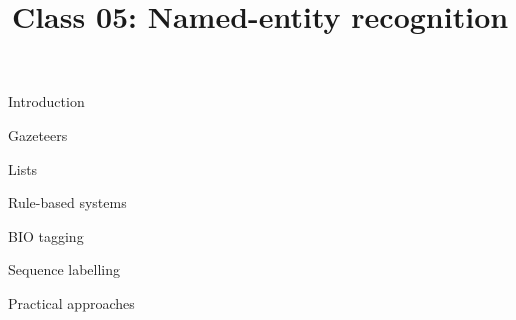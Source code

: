 \documentclass[10pt, compress]{beamer}
\title{Class 05: Named-entity recognition}
\begin{document}
\maketitle


\begin{frame}{Introduction}


\end{frame}


\begin{frame}

\end{frame}


\begin{frame}{Gazeteers}

\end{frame}

\begin{frame}{Lists}

\end{frame}

\begin{frame}{Rule-based systems}
\end{frame}

\begin{frame}{BIO tagging}

\end{frame}

\begin{frame}{Sequence labelling}

\end{frame}

\begin{frame}{Practical approaches}

\end{frame}





\end{document}
